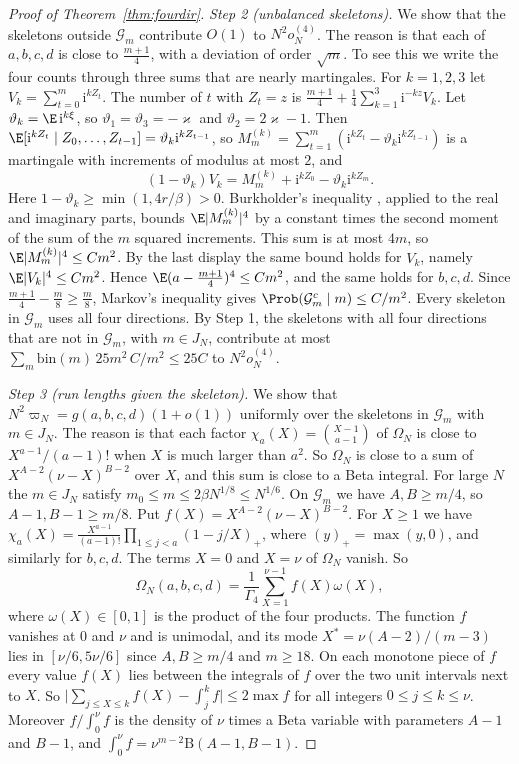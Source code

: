 \begin{proof}[Proof of Theorem~\ref{thm:fourdir}]
\emph{Step 2 (unbalanced skeletons).} We show that the skeletons outside $\mathcal G_m$ contribute
$O(1)$ to $N^2o^{(4)}_N$. The reason is that each of $a,b,c,d$ is close to $\frac{m+1}4$, with a
deviation of order $\sqrt m$. To see this we write the four counts through three sums that are
nearly martingales. For $k=1,2,3$ let $V_k=\sum_{t=0}^m\mathrm i^{kZ_t}$. The
number of $t$ with $Z_t=z$ is $\frac{m+1}4+\frac14\sum_{k=1}^3\mathrm i^{-kz}V_k$. Let
$\vartheta_k=\E\,\mathrm i^{k\xi}$, so $\vartheta_1=\vartheta_3=-\varkappa$ and
$\vartheta_2=2\varkappa-1$. Then
$\E[\mathrm i^{kZ_t}\mid Z_0,\dots,Z_{t-1}]=\vartheta_k\mathrm i^{kZ_{t-1}}$, so
$M^{(k)}_m=\sum_{t=1}^m(\mathrm i^{kZ_t}-\vartheta_k\mathrm i^{kZ_{t-1}})$ is a martingale with
increments of modulus at most $2$, and
\[
 (1-\vartheta_k)V_k=M^{(k)}_m+\mathrm i^{kZ_0}-\vartheta_k\mathrm i^{kZ_m}.
\]
Here $1-\vartheta_k\ge\min(1,4r/\beta)>0$. Burkholder's inequality \cite[Theorem~2.10]{hallheyde1980},
applied to the real and imaginary parts, bounds $\E\lvert M^{(k)}_m\rvert^4$ by a constant times
the second moment of the sum of the $m$ squared increments. This sum is at most $4m$, so
$\E\lvert M^{(k)}_m\rvert^4\le Cm^2$. By the last display the same bound holds for $V_k$, namely
$\E\lvert V_k\rvert^4\le Cm^2$. Hence $\E(a-\frac{m+1}4)^4\le Cm^2$, and the same holds for $b,c,d$.
Since $\frac{m+1}4-\frac m8\ge\frac m8$, Markov's inequality gives
$\Prob(\mathcal G_m^c\mid m)\le C/m^2$. Every skeleton in $\mathcal G_m$ uses all four directions. By
Step 1, the skeletons with all four directions that are not in $\mathcal G_m$, with $m\in J_N$,
contribute at most $\sum_m\mathrm{bin}(m)\,25m^2\,C/m^2\le25C$ to $N^2o^{(4)}_N$.

\emph{Step 3 (run lengths given the skeleton).} We show that $N^2\varpi_N=g(a,b,c,d)(1+o(1))$
uniformly over the skeletons in $\mathcal G_m$ with $m\in J_N$. The reason is that each
factor $\chi_a(X)=\binom{X-1}{a-1}$ of $\Omega_N$ is close to $X^{a-1}/(a-1)!$ when $X$ is much
larger than $a^2$. So $\Omega_N$ is close to a sum of $X^{A-2}(\nu-X)^{B-2}$ over $X$, and this sum
is close to a Beta integral. For large $N$ the $m\in J_N$ satisfy
$m_0\le m\le2\beta N^{1/8}\le N^{1/6}$. On $\mathcal G_m$ we have $A,B\ge m/4$, so
$A-1,B-1\ge m/8$. Put $f(X)=X^{A-2}(\nu-X)^{B-2}$. For
$X\ge1$ we have $\chi_a(X)=\frac{X^{a-1}}{(a-1)!}\prod_{1\le j<a}(1-j/X)_+$, where
$(y)_+=\max(y,0)$, and similarly for $b,c,d$. The terms $X=0$ and $X=\nu$ of $\Omega_N$ vanish. So
\[
 \Omega_N(a,b,c,d)=\frac1{\Gamma_4}\sum_{X=1}^{\nu-1}f(X)\omega(X),
\]
where $\omega(X)\in[0,1]$ is the product of the four products. The function $f$ vanishes at $0$ and
$\nu$ and is unimodal, and its mode $X^*=\nu(A-2)/(m-3)$ lies in $[\nu/6,5\nu/6]$ since
$A,B\ge m/4$ and $m\ge18$. On each monotone piece of $f$ every value $f(X)$ lies between the
integrals of $f$ over the two unit intervals next to $X$. So $\lvert\sum_{j\le X\le k}f(X)-\int_j^kf\rvert\le2\max f$ for all integers
$0\le j\le k\le\nu$. Moreover $f/\int_0^\nu f$ is the density of $\nu$ times a Beta variable with
parameters $A-1$ and $B-1$, and $\int_0^\nu f=\nu^{m-2}\mathrm B(A-1,B-1)$.


\end{proof}
